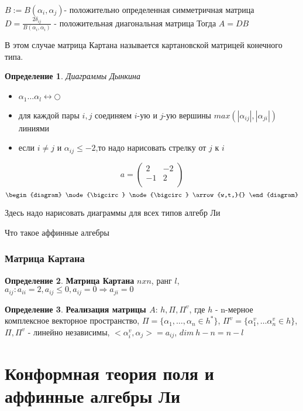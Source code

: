 \documentclass[a4paper,12pt]{article}
\theoremstyle{definition} \newtheorem{Def}{Определение}
\begin{document}
$B := B(\alpha_i,\alpha_j)$- положительно определенная симметричная матрица
$D=\frac{2\delta_{ij}}{B(\alpha_i,\alpha_i)}$ - положительная диагональная матрица
Тогда $A=DB$

В этом случае матрица Картана называется картановской матрицей конечного типа.

\begin{Def}
{\it Диаграммы Дынкина}
\begin{itemize}
\item $\alpha_1\dots \alpha_l \leftrightarrow \bigcirc$
\item для каждой пары $i,j$ соединяем $i$-ую и $j$-ую вершины $max(|\alpha_{ij}|,|\alpha_{ji}|)$ линиями
\item если $i\neq j$ и $\alpha_{ij}\leq -2$,то надо нарисовать стрелку от $j$ к $i$ 
\end{itemize}
\end{Def}

\[
a=
\left(
\begin{array}{cc}
2 & -2 \\
-1 & 2 \\
\end{array}
\right)
\]
\[
\begin{diagram}
  \node{\bigcirc} 
  \node{\bigcirc} \arrow{w,t,}{}
\end{diagram}
\]

Здесь надо нарисовать диаграммы для всех типов алгебр Ли

Что такое аффинные алгебры
\subsubsection{Матрица Картана}

\begin{Def}
  {\bf Матрица Картана} $nxn$, ранг $l$, $a_{ij}: a_{ii}=2, a_{ij}\leq 0, a_{ij}=0\Rightarrow a_{ji}=0$
\end{Def}
\begin{Def}
  {\bf Реализация матрицы $A$}: $h,\Pi,\Pi^{v}$, где $h$ -
  n-мерное комплексное векторное пространство,
  $\Pi=\{\alpha_1,\dots,\alpha_n\in h^{*}\}$,
  $\Pi^{v}=\{\alpha_1^v,\dots \alpha_n^v \in h\}$, $\Pi,\Pi^v$ -
  линейно независимы, $<\alpha_i^v,\alpha_j>=a_{ij}$, $dim\ h - n=n-l$
\end{Def}
\section{Конформная теория поля и аффинные алгебры Ли}
\end{document}
